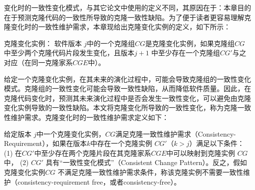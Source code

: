 变化时的一致性变化模式，与其它论文中使用的定义不同，其原因在于：本章目的在于预测克隆代码的一致性所导致的克隆一致性缺陷。为了便于读者更容易理解克隆变化时的一致性维护需求，本章现给出克隆变化实例的定义，如下所示：\\


\begin{definition}
[克隆变化实例] 
\label{def-changinginstance}
克隆变化实例：
软件版本 $j$中的一个克隆组$CG$是克隆变化实例，如果克隆组$CG$中至少两个克隆代码片段发生变化，且版本$j+1$ 中至少存在一个克隆组$CG'$与之对应（在同一克隆家系$CGE$中）。 
\end{definition}



给定一个克隆变化实例，在其未来的演化过程中，可能会导致克隆组的一致性变化模式。克隆组的一致性变化可能会导致一致性缺陷，从而降低软件质量。因此，在克隆代码变化时，预测其未来演化过程中是否会发生一致性变化，可以避免由克隆变化实例导致的一致性缺陷。本文将克隆变化所导致的一致性变化，称为克隆一致性维护需求。克隆变化时的一致性维护需求定义如下：\\

\begin{definition}
 \label{def-changingrequirement}
给定版本 $j$中一个克隆变化实例，$CG$满足克隆一致性维护需求（Consistency-Requirement），如果在版本$k$中存在一个克隆实例 $CG'$（$k>j$）满足以下条件： (1) 在$CG'$中至少存在两个克隆片段在其克隆家系$CGE$中可以映射到克隆实例 $CG$中， (2) $CG'$ 具有“一致性变化模式”（Consistent Change Pattern）。反之，假如克隆变化实例$CG$ 不满足克隆一致性维护需求条件，称该克隆实例不需要一致性维护（consistency-requirement free，或者consistency-free）。
\end{definition}

